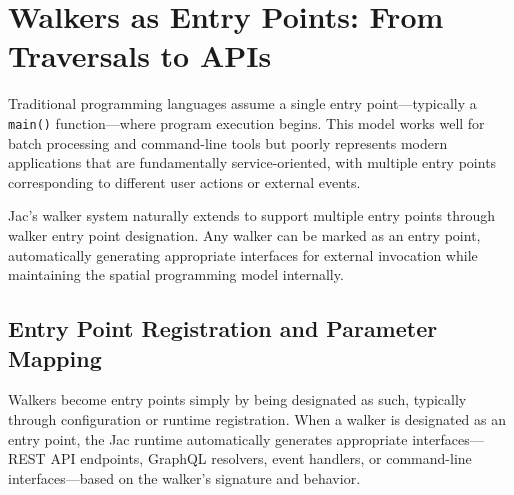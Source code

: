\section{Walkers as Entry Points: From Traversals to APIs}

Traditional programming languages assume a single entry point—typically a \texttt{main()} function—where program execution begins. This model works well for batch processing and command-line tools but poorly represents modern applications that are fundamentally service-oriented, with multiple entry points corresponding to different user actions or external events.

Jac's walker system naturally extends to support multiple entry points through walker entry point designation. Any walker can be marked as an entry point, automatically generating appropriate interfaces for external invocation while maintaining the spatial programming model internally.

\subsection{Entry Point Registration and Parameter Mapping}

Walkers become entry points simply by being designated as such, typically through configuration or runtime registration. When a walker is designated as an entry point, the Jac runtime automatically generates appropriate interfaces—REST API endpoints, GraphQL resolvers, event handlers, or command-line interfaces—based on the walker's signature and behavior.

